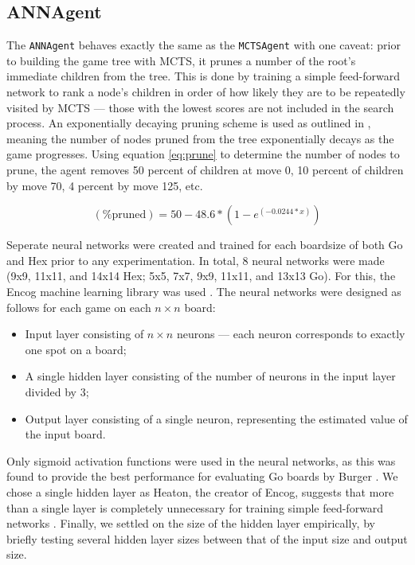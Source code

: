 \subsection{ANNAgent}
The \texttt{ANNAgent} behaves exactly the same as the \texttt{MCTSAgent} with one caveat: prior to building the game tree with MCTS, it prunes a number of the root's immediate children from the tree.  This is done by training a simple feed-forward network to rank a node's children in order of how likely they are to be repeatedly visited by MCTS --- those with the lowest scores are not included in the search process.  An exponentially decaying pruning scheme is used as outlined in \cite{annpruning}, meaning the number of nodes pruned from the tree exponentially decays as the game progresses.  Using equation \ref{eq:prune} to determine the number of nodes to prune, the agent removes 50 percent of children at move 0, 10 percent of children by move 70, 4 percent by move 125, etc.

\begin{equation}\label{eq:prune}
(\textrm{\% pruned}) = 50 - 48.6*(1 - e^{(-0.0244*x)})
\end{equation}

Seperate neural networks were created and trained for each boardsize of both Go and Hex prior to any experimentation.  In total, 8 neural networks were made (9x9, 11x11, and 14x14 Hex; 5x5, 7x7, 9x9, 11x11, and 13x13 Go).  For this, the Encog machine learning library was used \cite{encog}.  The neural networks were designed as follows for each game on each $n\times n$ board:
\begin{itemize}
\item Input layer consisting of $n\times n$ neurons --- each neuron corresponds to exactly one spot on a board;
\item A single hidden layer consisting of the number of neurons in the input layer divided by 3;
\item Output layer consisting of a single neuron, representing the estimated value of the input board.
\end{itemize}

Only sigmoid activation functions were used in the neural networks, as this was found to provide the best performance for evaluating Go boards by Burger \etal \cite{annpruning}.  We chose a single hidden layer as Heaton, the creator of Encog, suggests that more than a single layer is completely unnecessary for training simple feed-forward networks \cite{encog}.  Finally, we settled on the size of the hidden layer empirically, by briefly testing several hidden layer sizes between that of the input size and output size.

